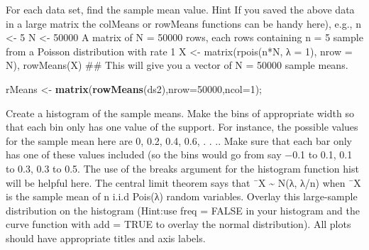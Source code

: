 \documentclass[
]{article}
\newenvironment{Shaded}{\begin{snugshade}}{\end{snugshade}}
\newcommand{\DataTypeTok}[1]{\textcolor[rgb]{0.13,0.29,0.53}{#1}}
\newcommand{\DecValTok}[1]{\textcolor[rgb]{0.00,0.00,0.81}{#1}}
\newcommand{\KeywordTok}[1]{\textcolor[rgb]{0.13,0.29,0.53}{\textbf{#1}}}
\newcommand{\NormalTok}[1]{#1}
\newcommand{\StringTok}[1]{\textcolor[rgb]{0.31,0.60,0.02}{#1}}
\begin{document}
For each data set, find the sample mean value. Hint If you saved the
above data in a large matrix the colMeans or rowMeans functions can be
handy here), e.g., n \textless- 5 N \textless- 50000 A matrix of N =
50000 rows, each rows containing n = 5 sample from a Poisson
distribution with rate 1 X \textless- matrix(rpois(n*N, λ = 1), nrow =
N), rowMeans(X) \#\# This will give you a vector of N = 50000 sample
means.

\begin{Shaded}
\begin{Highlighting}[]
\NormalTok{rMeans <-}\StringTok{ }\KeywordTok{matrix}\NormalTok{(}\KeywordTok{rowMeans}\NormalTok{(ds2),}\DataTypeTok{nrow=}\DecValTok{50000}\NormalTok{,}\DataTypeTok{ncol=}\DecValTok{1}\NormalTok{);}
\end{Highlighting}
\end{Shaded}

Create a histogram of the sample means. Make the bins of appropriate
width so that each bin only has one value of the support. For instance,
the possible values for the sample mean here are 0, 0.2, 0.4, 0.6, . .
.. Make sure that each bar only has one of these values included (so the
bins would go from say −0.1 to 0.1, 0.1 to 0.3, 0.3 to 0.5. The use of
the breaks argument for the histogram function hist will be helpful
here. The central limit theorem says that ¯X \textasciitilde{} N(λ, λ/n)
when ¯X is the sample mean of n i.i.d Pois(λ) random variables. Overlay
this large-sample distribution on the histogram (Hint:use freq = FALSE
in your histogram and the curve function with add = TRUE to overlay the
normal distribution). All plots should have appropriate titles and axis
labels.
\end{document}
